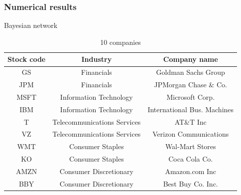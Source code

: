 \documentclass[xcolor={x11names,svgnames,dvipsnames}]{beamer}
\begin{document}
\begin{frame}
\frametitle{Numerical results}
\begin{block}{Bayesian network}
\begin{table}[h!]\small
  \caption{10 companies}
\begin{center}
    \begin{tabular}{| c | c| c | }
    \hline
    Stock code& Industry & Company name\\
    \hline
GS&Financials&Goldman Sachs Group\\
JPM&Financials&JPMorgan Chase \& Co.\\
MSFT&Information Technology&Microsoft Corp.\\
IBM&Information Technology&International Bus. Machines\\
T&Telecommunications Services&AT\&T Inc\\
VZ&Telecommunications Services&Verizon Communications\\
WMT&Consumer Staples&Wal-Mart Stores\\
KO&Consumer Staples&Coca Cola Co.\\
AMZN&Consumer Discretionary&Amazon.com Inc\\
BBY&Consumer Discretionary&Best Buy Co. Inc.\\

\hline
\end{tabular}
\end{center}
\end{table}
\end{block}

\end{frame}
\end{document}
